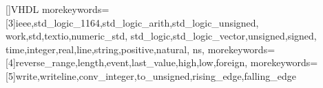 []{VHDL}%
{%
morekeywords=[3]{ieee,std_logic_1164,std_logic_arith,std_logic_unsigned,%
	work,std,textio,numeric_std,%
	std_logic,std_logic_vector,unsigned,signed,%
	time,integer,real,line,string,positive,natural,%
	ns},%
morekeywords=[4]{reverse_range,length,event,last_value,high,low,foreign},%
morekeywords=[5]{write,writeline,conv_integer,to_unsigned,rising_edge,falling_edge}%
}
